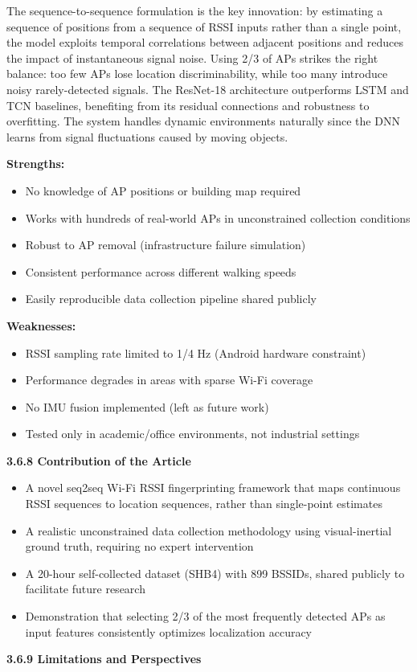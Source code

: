 \documentclass{ipgpmaster}
\begin{document}
The sequence-to-sequence formulation is the key innovation: by estimating a sequence of positions from a sequence of RSSI inputs rather than a single point, the model exploits temporal correlations between adjacent positions and reduces the impact of instantaneous signal noise. Using 2/3 of APs strikes the right balance: too few APs lose location discriminability, while too many introduce noisy rarely-detected signals. The ResNet-18 architecture outperforms LSTM and TCN baselines, benefiting from its residual connections and robustness to overfitting. The system handles dynamic environments naturally since the DNN learns from signal fluctuations caused by moving objects.

\textbf{Strengths:}

\begin{itemize}
    \item No knowledge of AP positions or building map required
    \item Works with hundreds of real-world APs in unconstrained collection conditions
    \item Robust to AP removal (infrastructure failure simulation)
    \item Consistent performance across different walking speeds
    \item Easily reproducible data collection pipeline shared publicly
\end{itemize}
\textbf{Weaknesses:}

\begin{itemize}
    \item RSSI sampling rate limited to 1/4 Hz (Android hardware constraint)
    \item Performance degrades in areas with sparse Wi-Fi coverage
    \item No IMU fusion implemented (left as future work)
    \item Tested only in academic/office environments, not industrial settings


\end{itemize}
\textbf{3.6.8 Contribution of the Article}

\begin{itemize}
    \item A novel seq2seq Wi-Fi RSSI fingerprinting framework that maps continuous RSSI sequences to location sequences, rather than single-point estimates
    \item A realistic unconstrained data collection methodology using visual-inertial ground truth, requiring no expert intervention
    \item A 20-hour self-collected dataset (SHB4) with 899 BSSIDs, shared publicly to facilitate future research
    \item Demonstration that selecting 2/3 of the most frequently detected APs as input features consistently optimizes localization accuracy


\end{itemize}
\textbf{3.6.9       Limitations and Perspectives}
\end{document}
